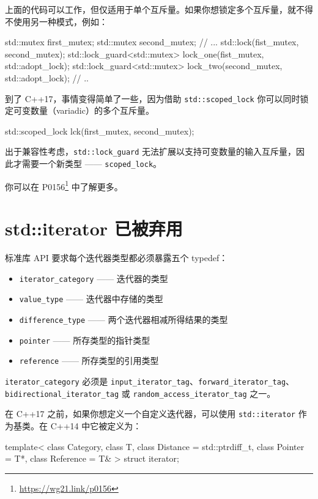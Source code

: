 上面的代码可以工作，但仅适用于单个互斥量。如果你想锁定多个互斥量，就不得不使用另一种模式，例如：

\begin{codebox}[cpp]
std::mutex first_mutex;
std::mutex second_mutex;
// ...
std::lock(fist_mutex, second_mutex);
std::lock_guard<std::mutex> lock_one(fist_mutex, std::adopt_lock);
std::lock_guard<std::mutex> lock_two(second_mutex, std::adopt_lock);
// ..
\end{codebox}

到了 C++17，事情变得简单了一些，因为借助 \texttt{std::scoped\_lock} 你可以同时锁定可变数量（variadic）的多个互斥量。

\begin{codebox}[cpp]
std::scoped_lock lck(first_mutex, second_mutex);
\end{codebox}

出于兼容性考虑，\texttt{std::lock\_guard} 无法扩展以支持可变数量的输入互斥量，因此才需要一个新类型 —— \texttt{scoped\_lock}。

你可以在 P0156\footnote{\url{https://wg21.link/p0156}} 中了解更多。


\section{std::iterator 已被弃用}

标准库 API 要求每个迭代器类型都必须暴露五个 typedef：

\begin{itemize}
\item \texttt{iterator\_category} —— 迭代器的类型
\item \texttt{value\_type} —— 迭代器中存储的类型
\item \texttt{difference\_type} —— 两个迭代器相减所得结果的类型
\item \texttt{pointer} —— 所存类型的指针类型
\item \texttt{reference} —— 所存类型的引用类型
\end{itemize}

\texttt{iterator\_category} 必须是 \texttt{input\_iterator\_tag}、\texttt{forward\_iterator\_tag}、\texttt{bidirectional\_iterator\_tag} 或 \texttt{random\_access\_iterator\_tag} 之一。

在 C++17 之前，如果你想定义一个自定义迭代器，可以使用 \texttt{std::iterator} 作为基类。在 C++14 中它被定义为：

\begin{codebox}[cpp]
template<
class Category,
class T,
class Distance = std::ptrdiff_t,
class Pointer = T*,
class Reference = T&
> struct iterator;
\end{codebox}

